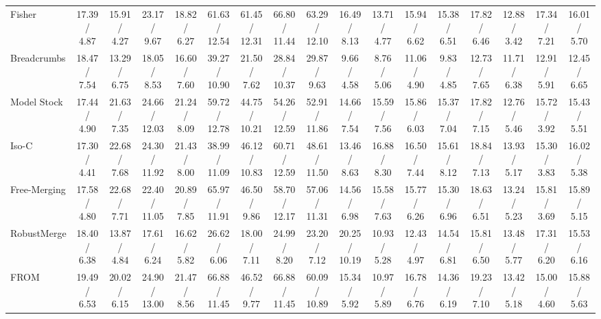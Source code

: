 \documentclass[letterpaper]{article} %
\newcommand{\pub}[1]{{\color{gray}{\footnotesize{[{#1}]}}}}
\begin{document}
\begin{table}[!t]
{\begin{tabular}{l||ccc:c|ccc:c|ccc:c|ccc:c}
Fisher\pub{NeurIPS 2022} & 17.39 / 4.87 & 15.91 / 4.27 & 23.17 / 9.67 & 18.82 / 6.27 & 61.63 / 12.54 & 61.45 / 12.31 & 66.80 / 11.44 & 63.29 / 12.10 & 16.49 / 8.13 & 13.71 / 4.77 & 15.94 / 6.62 & 15.38 / 6.51 & 17.82 / 6.46 & 12.88 / 3.42 & 17.34 / 7.21 & 16.01 / 5.70 \\

Breadcrumbs\pub{ECCV 2024} & 18.47 / 7.54 & 13.29 / 6.75 & 18.05 / 8.53 & 16.60 / 7.60 & 39.27 / 10.90 & 21.50 / 7.62 & 28.84 / 10.37 & 29.87 / 9.63 & 9.66 / 4.58 & 8.76 / 5.06 & 11.06 / 4.90 & 9.83 / 4.85 & 12.73 / 7.65 & 11.71 / 6.38 & 12.91 / 5.91 & 12.45 / 6.65 \\

Model Stock\pub{ECCV 2024} & 17.44 / 4.90 & 21.63 / 7.35 & 24.66 / 12.03 & 21.24 / 8.09 & 59.72 / 12.78 & 44.75 / 10.21 & 54.26 / 12.59 & 52.91 / 11.86 & 14.66 / 7.54 & 15.59 / 7.56 & 15.86 / 6.03 & 15.37 / 7.04 & 17.82 / 7.15 & 12.76 / 5.46 & 15.72 / 3.92 & 15.43 / 5.51 \\

Iso-C\pub{ICML 2025} & 17.30 / 4.41 & 22.68 / 7.68 & 24.30 / 11.92 & 21.43 / 8.00 & 38.99 / 11.09 & 46.12 / 10.83 & 60.71 / 12.59 & 48.61 / 11.50 & 13.46 / 8.63 & 16.88 / 8.30 & 16.50 / 7.44 & 15.61 / 8.12 & 18.84 / 7.13 & 13.93 / 5.17 & 15.30 / 3.83 & 16.02 / 5.38 \\

Free-Merging\pub{ICCV 2025} & 17.58 / 4.80 & 22.68 / 7.71 & 22.40 / 11.05 & 20.89 / 7.85 & 65.97 / 11.91 & 46.50 / 9.86 & 58.70 / 12.17 & 57.06 / 11.31 & 14.56 / 6.98 & 15.58 / 7.63 & 15.77 / 6.26 & 15.30 / 6.96 & 18.63 / 6.51 & 13.24 / 5.23 & 15.81 / 3.69 & 15.89 / 5.15 \\

RobustMerge\pub{NeurIPS 2025} & 18.40 / 6.38 & 13.87 / 4.84 & 17.61 / 6.24 & 16.62 / 5.82 & 26.62 / 6.06 & 18.00 / 7.11 & 24.99 / 8.20 & 23.20 / 7.12 & 20.25 / 10.19 & 10.93 / 5.28 & 12.43 / 4.97 & 14.54 / 6.81 & 15.81 / 6.50 & 13.48 / 5.77 & 17.31 / 6.20 & 15.53 / 6.16 \\

FROM\pub{AAAI 2026} & 19.49 / 6.53 & 20.02 / 6.15 & 24.90 / 13.00 & 21.47 / 8.56 & 66.88 / 11.45 & 46.52 / 9.77 & 66.88 / 11.45 & 60.09 / 10.89 & 15.34 / 5.92 & 10.97 / 5.89 & 16.78 / 6.76 & 14.36 / 6.19 & 19.23 / 7.10 & 13.42 / 5.18 & 15.00 / 4.60 & 15.88 / 5.63 \\


\end{tabular}}
\end{table}
\end{document}
